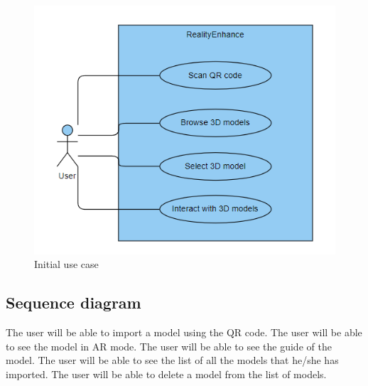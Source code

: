 \begin{figure}[ht]
    \centering
    \includegraphics{img/UseCaseDiagram.png}
    \caption{Initial use case}
    \label{fig:InitialUseCase}
\end{figure}

\clearpage

\subsection*{Sequence diagram}
The user will be able to import a model using the \ac{QR} code. The user will be able to see the model in \ac{AR} mode. The user will be able to see the guide of the model. The user will be able to see the list of all the models that he/she has imported. The user will be able to delete a model from the list of models.

